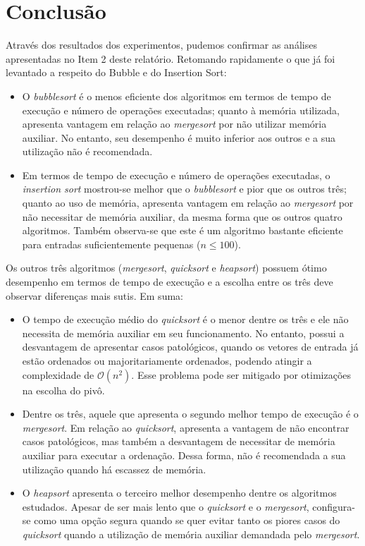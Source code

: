 \documentclass[fontsize=10pt]{article}
\begin{document}
\section{Conclusão}
    
\quad Através dos resultados dos experimentos, pudemos confirmar as análises apresentadas no Item 2 deste relatório. Retomando rapidamente o que já foi levantado a respeito do Bubble e do Insertion Sort:

\begin{itemize}
    \item O \textit{bubblesort} é o menos eficiente dos algoritmos em termos de tempo de execução e número de operações executadas; quanto à memória utilizada, apresenta vantagem em relação ao \textit{mergesort} por não utilizar memória auxiliar. No entanto, seu desempenho é muito inferior aos outros e a sua utilização não é recomendada.
    
    \item Em termos de tempo de execução e número de operações executadas, o \textit{insertion sort} mostrou-se melhor que o \textit{bubblesort} e pior que os outros três; quanto ao uso de memória, apresenta vantagem em relação ao \textit{mergesort} por não necessitar de memória auxiliar, da mesma forma que os outros quatro algoritmos. Também observa-se que este é um algoritmo bastante eficiente para entradas suficientemente pequenas ($n \leq 100$).
\end{itemize}

\quad Os outros três algoritmos (\textit{mergesort}, \textit{quicksort} e \textit{heapsort}) possuem ótimo desempenho em termos de tempo de execução e a escolha entre os três deve observar diferenças mais sutis. Em suma:

\begin{itemize}
    \item O tempo de execução médio do \textit{quicksort} é o menor dentre os três e ele não necessita de memória auxiliar em seu funcionamento. No entanto, possui a desvantagem de apresentar casos patológicos, quando os vetores de entrada já estão ordenados ou majoritariamente ordenados, podendo atingir a complexidade de $\mathcal{O}(n^2)$. Esse problema pode ser mitigado por otimizações na escolha do pivô.
    
    \item Dentre os três, aquele que apresenta o segundo melhor tempo de execução é o \textit{mergesort}. Em relação ao \textit{quicksort}, apresenta a vantagem de não encontrar casos patológicos, mas também a desvantagem de necessitar de memória auxiliar para executar a ordenação. Dessa forma, não é recomendada a sua utilização quando há escassez de memória.
    
    \item O \textit{heapsort} apresenta o terceiro melhor desempenho dentre os algoritmos estudados. Apesar de ser mais lento que o \textit{quicksort} e o \textit{mergesort}, configura-se como uma opção segura quando se quer evitar tanto os piores casos do \textit{quicksort} quando a utilização de memória auxiliar demandada pelo \textit{mergesort}.
\end{itemize}
\end{document}
